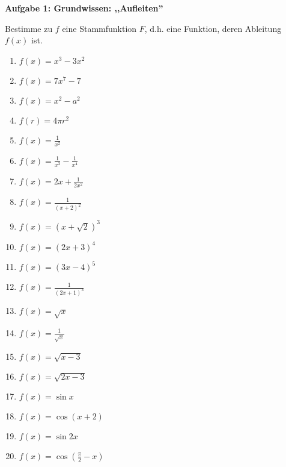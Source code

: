 \documentclass[a4paper,12pt]{article}
\newcommand{\Aufgabe}[1]{
  {
  \vspace*{0.5cm}
  \textsf{\textbf{Aufgabe #1}}
  \vspace*{0.2cm}
  
  }
}
\begin{document}
\vspace{1cm}


\vspace{1cm}
\fbox{%
  \begin{minipage}{\textwidth}
    \[ \int \frac{f'(x)}{f(x)}\,dx = \ln{|f(x)|}+c \quad \quad \quad
       \int f'(x)\cdot e^{f(x)}\,dx = e^{f(x)}+c \]
  \end{minipage}
}


\newpage

\Aufgabe{1: Grundwissen: ,,Aufleiten''}
Bestimme zu $f$ eine Stammfunktion $F$, d.h. eine Funktion, deren Ableitung $f(x)$ ist.
\begin{enumerate}[label={\alph*)}, topsep=5pt,itemsep=4ex,partopsep=1ex,parsep=1ex]
  \item $f(x)=x^3-3x^2$
  \item $f(x)=7x^7-7$
  \item $f(x)=x^2-a^2$
  \item $f(r)=4\pi r^2$
  \item $f(x)=\frac{1}{x^2}$
  \item $f(x)=\frac{1}{x^3} - \frac{1}{x^4}$
  \item $f(x)=2x+\frac{1}{2x^2}$
  \item $f(x)=\frac{1}{(x+2)^2}$
  \item $f(x)=(x+\sqrt{2})^3$
  \item $f(x)=(2x+3)^4$
  \item $f(x)=(3x-4)^5$
  \item $f(x)=\frac{1}{(2x+1)^3}$
  \item $f(x)=\sqrt{x}$
  \item $f(x)=\frac{1}{\sqrt{x}}$
  \item $f(x)=\sqrt{x-3}$
  \item $f(x)=\sqrt{2x-3}$
  \item $f(x)=\sin x$
  \item $f(x)=\cos(x+2)$
  \item $f(x)=\sin{2x}$
  \item $f(x)=\cos(\frac{\pi}{2}-x)$
\end{enumerate}
\end{document}
